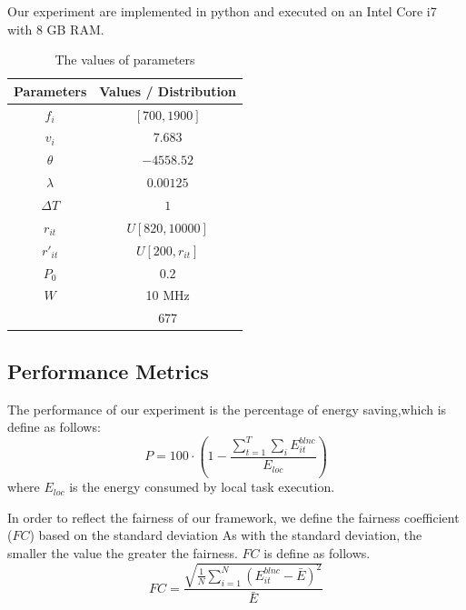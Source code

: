 \documentclass[conference]{IEEEtran}
\begin{document}
Our experiment are implemented in python and executed on an Intel Core i7 with 8 GB RAM.

\begin{table}[]
	\centering
	\caption{The values of parameters}
	\begin{tabular}{|c|c|}
		\hline
		Parameters    &    Values / Distribution   \\
		\hline
		
		$f_i$	          & $[700, 1900] $     \\
		$v_i$        &  $7.683$   \\
		$\theta $    & $-4558.52 $\\
		$\lambda$    &  $0.00125$ \\
		
		$\Delta T$      &   $1$   \\
		
		$r_{it}$     &     $ U[820, 10000]$   \\
		$r'_{it} $  &   $ U[200, r_{it}]$ \\
		
		$P_0$      &   $0.2$   \\
		$W$ & 10 MHz \\
		\text{SNR} & 677\\
		\hline
	\end{tabular}
\end{table}

\subsection{Performance Metrics}
The performance of our experiment is the percentage of energy saving,which is define as follows:
\begin{equation}
	P = 100 \cdot 
	( 1-
	\frac{
		\sum \limits _{t=1} ^{T} \sum \limits _{i} E^{blnc}_{it}   }{E_{loc}})
\end{equation}
where $E_{loc}$ is the energy consumed by local task execution. 

In order to reflect the fairness of our framework, we define the fairness coefficient ($FC$) based on the standard deviation
As with the standard deviation, the smaller the value the greater the fairness. $FC$ is define as follows.
\begin{equation}
	FC=\frac{\sqrt{\frac{1}{N} \sum_{i=1}^{N}\left(E_{it}^{b l n c}-\bar{E}\right)^{2}}}{\bar{E}}
\end{equation}
\end{document}

